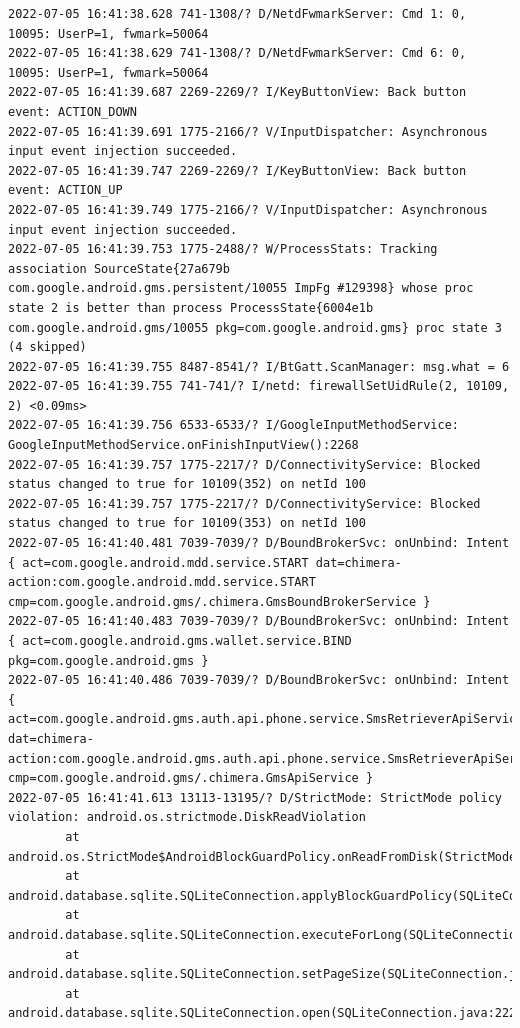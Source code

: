 \documentclass[a4paper,12pt]{book}
\begin{document}
\begin{lstlisting}
2022-07-05 16:41:38.628 741-1308/? D/NetdFwmarkServer: Cmd 1: 0, 10095: UserP=1, fwmark=50064
2022-07-05 16:41:38.629 741-1308/? D/NetdFwmarkServer: Cmd 6: 0, 10095: UserP=1, fwmark=50064
2022-07-05 16:41:39.687 2269-2269/? I/KeyButtonView: Back button event: ACTION_DOWN
2022-07-05 16:41:39.691 1775-2166/? V/InputDispatcher: Asynchronous input event injection succeeded.
2022-07-05 16:41:39.747 2269-2269/? I/KeyButtonView: Back button event: ACTION_UP
2022-07-05 16:41:39.749 1775-2166/? V/InputDispatcher: Asynchronous input event injection succeeded.
2022-07-05 16:41:39.753 1775-2488/? W/ProcessStats: Tracking association SourceState{27a679b com.google.android.gms.persistent/10055 ImpFg #129398} whose proc state 2 is better than process ProcessState{6004e1b com.google.android.gms/10055 pkg=com.google.android.gms} proc state 3 (4 skipped)
2022-07-05 16:41:39.755 8487-8541/? I/BtGatt.ScanManager: msg.what = 6
2022-07-05 16:41:39.755 741-741/? I/netd: firewallSetUidRule(2, 10109, 2) <0.09ms>
2022-07-05 16:41:39.756 6533-6533/? I/GoogleInputMethodService: GoogleInputMethodService.onFinishInputView():2268 
2022-07-05 16:41:39.757 1775-2217/? D/ConnectivityService: Blocked status changed to true for 10109(352) on netId 100
2022-07-05 16:41:39.757 1775-2217/? D/ConnectivityService: Blocked status changed to true for 10109(353) on netId 100
2022-07-05 16:41:40.481 7039-7039/? D/BoundBrokerSvc: onUnbind: Intent { act=com.google.android.mdd.service.START dat=chimera-action:com.google.android.mdd.service.START cmp=com.google.android.gms/.chimera.GmsBoundBrokerService }
2022-07-05 16:41:40.483 7039-7039/? D/BoundBrokerSvc: onUnbind: Intent { act=com.google.android.gms.wallet.service.BIND pkg=com.google.android.gms }
2022-07-05 16:41:40.486 7039-7039/? D/BoundBrokerSvc: onUnbind: Intent { act=com.google.android.gms.auth.api.phone.service.SmsRetrieverApiService.START dat=chimera-action:com.google.android.gms.auth.api.phone.service.SmsRetrieverApiService.START cmp=com.google.android.gms/.chimera.GmsApiService }
2022-07-05 16:41:41.613 13113-13195/? D/StrictMode: StrictMode policy violation: android.os.strictmode.DiskReadViolation
        at android.os.StrictMode$AndroidBlockGuardPolicy.onReadFromDisk(StrictMode.java:1571)
        at android.database.sqlite.SQLiteConnection.applyBlockGuardPolicy(SQLiteConnection.java:1138)
        at android.database.sqlite.SQLiteConnection.executeForLong(SQLiteConnection.java:688)
        at android.database.sqlite.SQLiteConnection.setPageSize(SQLiteConnection.java:260)
        at android.database.sqlite.SQLiteConnection.open(SQLiteConnection.java:222)

\end{lstlisting}
\end{document}
